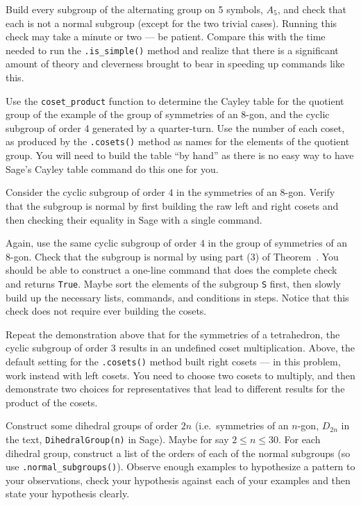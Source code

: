 \begin{sageverbatim}\end{sageverbatim}
%
%
Build every subgroup of the alternating group on 5 symbols, $A_5$, and check that each is not a normal subgroup (except for the two trivial cases).  Running this check may take a minute or two --- be patient.  Compare this with the time needed to run the \verb?.is_simple()? method and realize that there is a significant amount of theory and cleverness brought to bear in speeding up commands like this.
\begin{sageverbatim}\end{sageverbatim}
%
%
Use the \verb?coset_product? function to determine the Cayley table for the quotient group of the example of the group of symmetries of an 8-gon, and the cyclic subgroup of order 4 generated by a quarter-turn.  Use the number of each coset, as produced by the \verb?.cosets()? method as names for the elements of the quotient group.  You will need to build the table ``by hand'' as there is no easy way to have Sage's Cayley table command do this one for you.
\begin{sageverbatim}\end{sageverbatim}
%
%
Consider  the cyclic subgroup of order $4$ in the symmetries of an 8-gon.  Verify that the subgroup is normal by first building the raw left and right cosets and then checking their equality in Sage with a single command.
\begin{sageverbatim}\end{sageverbatim}
%
%
Again, use the same cyclic subgroup of order $4$ in the group of symmetries of an 8-gon.  Check that the subgroup is normal by using part (3) of Theorem~.  You should be able to construct a one-line command that does the complete check and returns \verb?True?.  Maybe sort the elements of the subgroup \verb?S? first, then slowly build up the necessary lists, commands, and conditions in steps.  Notice that this check does not require ever building the cosets.
\begin{sageverbatim}\end{sageverbatim}
%
%
Repeat the demonstration above that for the symmetries of a tetrahedron, the cyclic subgroup of order 3  results in an undefined coset multiplication.  Above, the default setting for the \verb?.cosets()? method built right cosets --- in this problem, work instead with left cosets.  You need to choose two cosets to multiply, and then demonstrate two choices for representatives that lead to different results for the product of the cosets.
\begin{sageverbatim}\end{sageverbatim}
%
%
Construct some dihedral groups of order $2n$ (i.e.\ symmetries of an $n$-gon, $D_{2n}$ in the text, \verb?DihedralGroup(n)? in Sage).  Maybe for say $2\leq n \leq 30$.  For each dihedral group, construct a list of the orders of each of the normal subgroups (so use \verb?.normal_subgroups()?).  Observe enough examples to hypothesize a pattern to your observations, check your hypothesis against each of your examples and then state your hypothesis clearly.
%
